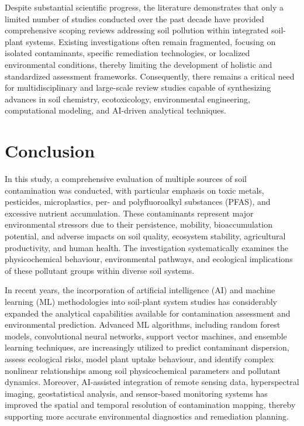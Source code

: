 \documentclass[sn-mathphys-num]{sn-jnl}
\begin{document}
Despite substantial scientific progress, the literature demonstrates that only
a limited number of studies conducted over the past decade have provided
comprehensive scoping reviews addressing soil pollution within integrated
soil-plant systems. Existing investigations often remain fragmented, focusing
on isolated contaminants, specific remediation technologies, or localized
environmental conditions, thereby limiting the development of holistic and
standardized assessment frameworks. Consequently, there remains a critical need
for multidisciplinary and large-scale review studies capable of synthesizing
advances in soil chemistry, ecotoxicology, environmental engineering,
computational modeling, and AI-driven analytical techniques.

\section{Conclusion}\label{sec6}

In this study, a comprehensive evaluation of multiple sources of soil
contamination was conducted, with particular emphasis on toxic metals,
pesticides, microplastics, per- and polyfluoroalkyl substances (PFAS), and
excessive nutrient accumulation. These contaminants represent major
environmental stressors due to their persistence, mobility, bioaccumulation
potential, and adverse impacts on soil quality, ecosystem stability,
agricultural productivity, and human health. The investigation systematically
examines the physicochemical behaviour, environmental pathways, and ecological
implications of these pollutant groups within diverse soil systems.

In recent years, the incorporation of artificial intelligence (AI) and machine
learning (ML) methodologies into soil-plant system studies has considerably
expanded the analytical capabilities available for contamination assessment
and environmental prediction. Advanced ML algorithms, including random forest
models, convolutional neural networks, support vector machines, and ensemble
learning techniques, are increasingly utilized to predict contaminant
dispersion, assess ecological risks, model plant uptake behaviour, and identify
complex nonlinear relationships among soil physicochemical parameters and
pollutant dynamics. Moreover, AI-assisted integration of remote sensing data,
hyperspectral imaging, geostatistical analysis, and sensor-based monitoring
systems has improved the spatial and temporal resolution of contamination
mapping, thereby supporting more accurate environmental diagnostics and
remediation planning.
\end{document}
